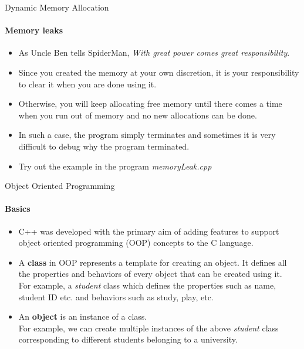 \documentclass[aspectratio=169]{beamer}
\begin{document}
\begin{frame}[fragile]{Dynamic Memory Allocation}
	\framesubtitle{Memory leaks}
	\begin{itemize}
		\item As Uncle Ben tells SpiderMan, \textit{With great power comes great responsibility}.
		\item Since you created the memory at your own discretion, it is your responsibility to clear it when you are done using it.
		\item Otherwise, you will keep allocating free memory until there comes a time when you run out of memory and no new allocations can be done.
		\item In such a case, the program simply terminates and sometimes it is very difficult to debug why the program terminated.
		\item Try out the example in the program \textit{memoryLeak.cpp}
	\end{itemize}
\end{frame}

\begin{frame}[fragile]{Object Oriented Programming}
	\framesubtitle{Basics}
	\begin{itemize}
		\item C++ was developed with the primary aim of adding features to support object oriented programming (OOP) concepts to the C language.
		\item A \textbf{class} in OOP represents a template for creating an object. It defines all the properties and behaviors of every object that can be created using it. \\For example, a \textit{student} class which defines the properties such as name, student ID etc. and behaviors such as study, play, etc.
		\item An \textbf{object} is an instance of a class. \\For example, we can create multiple instances of the above \textit{student} class corresponding to different students belonging to a university.
	\end{itemize}
\end{frame}
\end{document}
